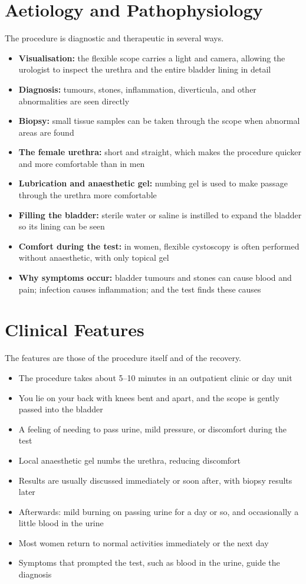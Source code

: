 \section*{Aetiology and Pathophysiology}
The procedure is diagnostic and therapeutic in several ways.
\begin{itemize}
    \item \textbf{Visualisation:} the flexible scope carries a light and camera, allowing the urologist to inspect the urethra and the entire bladder lining in detail
    \item \textbf{Diagnosis:} tumours, stones, inflammation, diverticula, and other abnormalities are seen directly
    \item \textbf{Biopsy:} small tissue samples can be taken through the scope when abnormal areas are found
    \item \textbf{The female urethra:} short and straight, which makes the procedure quicker and more comfortable than in men
    \item \textbf{Lubrication and anaesthetic gel:} numbing gel is used to make passage through the urethra more comfortable
    \item \textbf{Filling the bladder:} sterile water or saline is instilled to expand the bladder so its lining can be seen
    \item \textbf{Comfort during the test:} in women, flexible cystoscopy is often performed without anaesthetic, with only topical gel
    \item \textbf{Why symptoms occur:} bladder tumours and stones can cause blood and pain; infection causes inflammation; and the test finds these causes
\end{itemize}

\section*{Clinical Features}
The features are those of the procedure itself and of the recovery.
\begin{itemize}
    \item The procedure takes about 5--10 minutes in an outpatient clinic or day unit
    \item You lie on your back with knees bent and apart, and the scope is gently passed into the bladder
    \item A feeling of needing to pass urine, mild pressure, or discomfort during the test
    \item Local anaesthetic gel numbs the urethra, reducing discomfort
    \item Results are usually discussed immediately or soon after, with biopsy results later
    \item Afterwards: mild burning on passing urine for a day or so, and occasionally a little blood in the urine
    \item Most women return to normal activities immediately or the next day
    \item Symptoms that prompted the test, such as blood in the urine, guide the diagnosis
\end{itemize}

